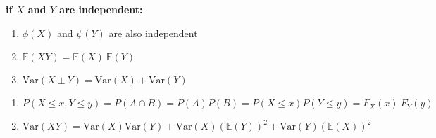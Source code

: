 \textbf{if $X$ and $Y$ are independent:}

\begin{multicols}{2}
\begin{enumerate}[resume*=calcrulesrv]
    \item $\phi(X)$ and $\psi(Y)$ are also independent
    \hfill \cite{statistics/book/Statistics-for-Data-Scientists/Maurits-Kaptein}

    \item $\mathbb{E}(X Y ) = \mathbb{E}(X)\ \mathbb{E}(Y )$
    \hfill \cite{statistics/book/Statistics-for-Data-Scientists/Maurits-Kaptein}

    \item $\text{Var}(X \pm Y ) = \text{Var}(X) + \text{Var}(Y )$
    \hfill \cite{statistics/book/Statistics-for-Data-Scientists/Maurits-Kaptein}

\end{enumerate}
\end{multicols}


\begin{enumerate}[resume*=calcrulesrv]
    \item
    $
        P(X \leq x, Y \leq y)
        = P(A \cap B)
        = P(A) P(B)
        = P(X \leq x) P(Y \leq y)
        = F _X (x)\ F_Y (y)
    $
    \hfill \cite{statistics/book/Statistics-for-Data-Scientists/Maurits-Kaptein}

    \item
    $
        \text{Var}(X Y )
        = \text{Var}(X) \text{Var}(Y)
            + \text{Var}(X)(\mathbb{E}(Y))^2
            + \text{Var}(Y)(\mathbb{E}(X))^2
    $
    \hfill \cite{statistics/book/Statistics-for-Data-Scientists/Maurits-Kaptein}
\end{enumerate}
























